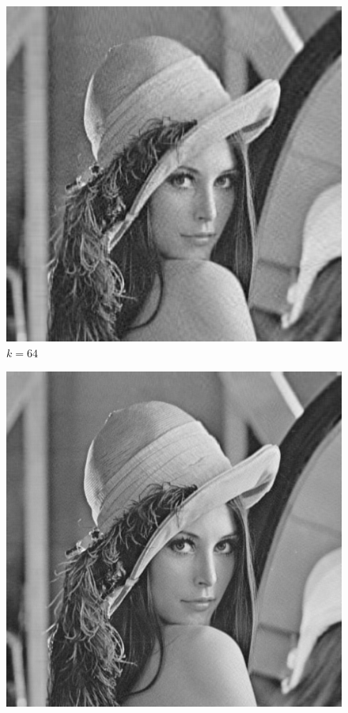 \documentclass[10pt]{article}
\begin{document}
\begin{enumerate}[label=3.\arabic*]
\begin{figure}[H]
\begin{minipage}[c]{0.45\textwidth}
			\caption{$k=32$}
		\end{minipage}%
		\begin{minipage}[c]{0.45\textwidth}
			\centering
			\includegraphics[width=1\textwidth]{./SVD/k = 64.png}
			\caption{$k=64$}
		\end{minipage}
	\end{figure}
 	\begin{figure}[H]
		\centering
		\begin{minipage}[c]{0.45\textwidth} 
			\centering
			\includegraphics[width=1\textwidth]{./SVD/k = 128.png}

\end{minipage}
\end{figure}
\end{enumerate}
\end{document}
